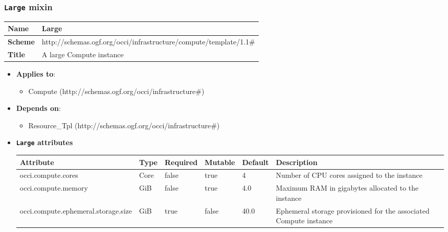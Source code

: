  
\subsubsection{\texttt{Large} mixin}
\begin{center}
\begin{tabular}{|l|l|}
  \hline
  \textbf{Name} & Large \\
  \hline  
  \textbf{Scheme} & http://schemas.ogf.org/occi/infrastructure/compute/template/1.1\# \\
  \hline
  \textbf{Title} & A large Compute instance \\
  \hline
\end{tabular}
\end{center}
\begin{itemize}
\item \textbf{Applies to}:
\begin{itemize}
	\item Compute (http://schemas.ogf.org/occi/infrastructure\#)
\end{itemize}
\end{itemize} 
\begin{itemize}
\item \textbf{Depends on}:
\begin{itemize}
	\item Resource\_Tpl (http://schemas.ogf.org/occi/infrastructure\#)
\end{itemize}
\end{itemize}

\begin{itemize}
\item \textbf{\texttt{Large} attributes}

\begin{tabularx}{\textwidth}{|l|l|p{1.4cm}|p{1.3cm}|l|X|}
  \hline
  \textbf{Attribute} & \textbf{Type} & \textbf{Required} & \textbf{Mutable} & \textbf{Default} & \textbf{Description} \\
  \hline  
  occi.compute.cores & Core & false & true & 4 & Number of CPU cores assigned to the instance \\
  \hline
  occi.compute.memory & GiB & false & true & 4.0 & Maximum RAM in gigabytes allocated to the instance \\
  \hline
  occi.compute.ephemeral.storage.size & GiB & true & false & 40.0 & Ephemeral storage provisioned for the associated Compute instance \\
  \hline
\end{tabularx}
\end{itemize}


